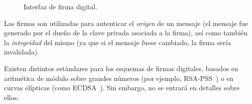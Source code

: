 \begin{figure}
  \centering
  \hspace{1.4em}
  \hspace{1.4em}
  \caption{Interfaz de firma digital.}
  \label{fig:digital-signatures}
\end{figure}


Las firmas son utilizadas para autenticar el \textit{origen} de un mensaje (el mensaje fue generado por el dueño de la clave privada
asociada a la firma), así como también la \textit{integridad} del mismo (ya que si el mensaje fuese cambiado, la firma sería invalidada).

%

Existen distintos estándares para los esquemas de firmas digitales, basados en aritmética de módulo sobre grandes números (por ejemplo,
RSA-PSS~\cite{pss.rsa}) o en curvas elípticas (como ECDSA~\cite{ecdsa}).
Sin embargo, no se entrará en detalles sobre ellos.

